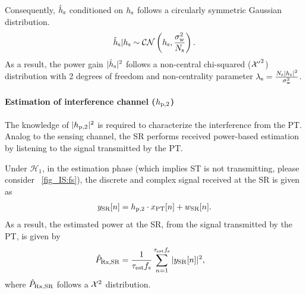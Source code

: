 Consequently, $\hat{h}_{\text{s}}$ conditioned on $h_{\text{s}}$ follows a circularly symmetric Gaussian distribution.
\begin{align}
\ehs|\hs \sim \mathcal{CN}\left( \hs,\evar \right).
\label{eq_IS:ehs} 
\end{align}
As a result, the power gain $|\hat{h}_{\text{s}}|^2$ follows a non-central chi-squared ($\ncchi2$) distribution with 2 degrees of freedom and non-centrality parameter $\lambda_{\text{s}} = \frac{N_{\text{s}} |h_{\text{s}}|^2}{\sigma^2_{\text{w}}}$.

\paragraph{Estimation of interference channel ($h_{\text{p,2}}$)}
The knowledge of $|h_{\text{p,2}}|^2$ is required to characterize the interference from the PT.
Analog to the sensing channel, the SR performs received power-based estimation by listening to the signal transmitted by the PT.

Under $\mathcal H_1$, in the estimation phase (which implies ST is not transmitting, please consider \figurename~\ref{fig_IS:fs}), the discrete and complex signal received at the SR is given as
\begin{align}
\ys[n] = \hpt \cdot \xp[n] + \wsr[n].
\label{eq_IS:sys_mod_p2s}
\end{align}
As a result, the estimated power at the SR, from the signal transmitted by the PT, is given by
\begin{align} 
\eprcvdsr &= \frac{1}{\Kp} \sum\limits_{n = 1}^{\Kp} |\ys[n]|^2,
\label{eq_IS:ehp2}
\end{align}
where $\hat{P}_{\text{Rx,SR}}$ follows a $\cchi2$ distribution.%

